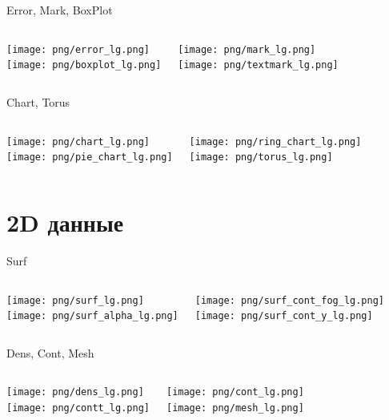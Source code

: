 \documentclass[color=usenames]{beamer}
\begin{document}
\begin{frame}{Error, Mark, BoxPlot}
\begin{columns}
\texttt{[image: png/error\_lg.png]}\\
\texttt{[image: png/boxplot\_lg.png]}

\texttt{[image: png/mark\_lg.png]}\\
\texttt{[image: png/textmark\_lg.png]}

\end{columns}
\end{frame}

\begin{frame}{Chart, Torus}
\begin{columns}
\texttt{[image: png/chart\_lg.png]}\\
\texttt{[image: png/pie\_chart\_lg.png]}

\texttt{[image: png/ring\_chart\_lg.png]}\\
\texttt{[image: png/torus\_lg.png]}

\end{columns}
\end{frame}


\section{2D данные}

\begin{frame}{Surf}
\begin{columns}
\texttt{[image: png/surf\_lg.png]}\\
\texttt{[image: png/surf\_alpha\_lg.png]}

\texttt{[image: png/surf\_cont\_fog\_lg.png]}\\
\texttt{[image: png/surf\_cont\_y\_lg.png]}

\end{columns}
\end{frame}

\begin{frame}{Dens, Cont, Mesh}
\begin{columns}
\texttt{[image: png/dens\_lg.png]}\\
\texttt{[image: png/contt\_lg.png]}

\texttt{[image: png/cont\_lg.png]}\\
\texttt{[image: png/mesh\_lg.png]}

\end{columns}
\end{frame}
\end{document}
